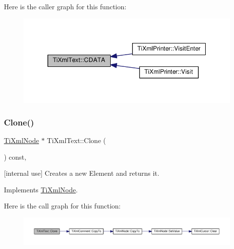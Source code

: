 Here is the caller graph for this function\+:\nopagebreak
\begin{figure}[H]
\begin{center}
\leavevmode
\includegraphics[width=337pt]{class_ti_xml_text_aac1f4764d220ed6bf809b16dfcb6b45a_icgraph}
\end{center}
\end{figure}
\mbox{\label{class_ti_xml_text_a98a20d7a4f1c1478e25e34921be24bfe}} 
\subsubsection{\texorpdfstring{Clone()}{Clone()}}
{\footnotesize\ttfamily \hyperlink{class_ti_xml_node}{Ti\+Xml\+Node} $\ast$ Ti\+Xml\+Text\+::\+Clone (\begin{DoxyParamCaption}{ }\end{DoxyParamCaption}) const\hspace{0.3cm}{\ttfamily [protected]}, {\ttfamily [virtual]}}



\mbox{[}internal use\mbox{]} Creates a new Element and returns it. 



Implements \hyperlink{class_ti_xml_node_a4508cc3a2d7a98e96a54cc09c37a78a4}{Ti\+Xml\+Node}.

Here is the call graph for this function\+:\nopagebreak
\begin{figure}[H]
\begin{center}
\leavevmode
\includegraphics[width=350pt]{class_ti_xml_text_a98a20d7a4f1c1478e25e34921be24bfe_cgraph}
\end{center}
\end{figure}
\mbox{\label{class_ti_xml_text_a480b8e0ad6b7833a73ecf2191195c9b5}} 
